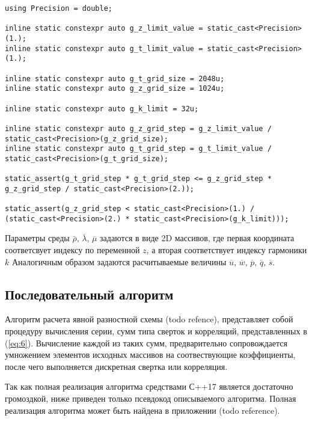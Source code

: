 \begin{lstlisting}
using Precision = double;

inline static constexpr auto g_z_limit_value = static_cast<Precision>(1.);
inline static constexpr auto g_t_limit_value = static_cast<Precision>(1.);

inline static constexpr auto g_t_grid_size = 2048u;
inline static constexpr auto g_z_grid_size = 1024u;

inline static constexpr auto g_k_limit = 32u;

inline static constexpr auto g_z_grid_step = g_z_limit_value / static_cast<Precision>(g_z_grid_size);
inline static constexpr auto g_t_grid_step = g_t_limit_value / static_cast<Precision>(g_t_grid_size);

static_assert(g_t_grid_step * g_t_grid_step <= g_z_grid_step * g_z_grid_step / static_cast<Precision>(2.));

static_assert(g_z_grid_step < static_cast<Precision>(1.) / (static_cast<Precision>(2.) * static_cast<Precision>(g_k_limit)));
\end{lstlisting}

Параметры среды $\overline\rho$, $\overline\lambda$, $\overline\mu$ задаются в виде 2D массивов, 
где первая координата соответсвует индексу по переменной $z$, а вторая соответствует индексу гармоники $k$
Аналогичным образом задаются расчитываемые величины $\overline u$, $\overline w$, $\overline p$, $\overline q$, $\overline s$.

\subsection{Последовательный алгоритм}

Алгоритм расчета явной разностной схемы (todo refence), представляет собой процедуру вычисления серии, сумм типа сверток и корреляций,
представленных в (\ref{eq:6}). Вычисление каждой из таких сумм, предварительно сопровождается умножением элементов исходных 
массивов на соотвествующие коэффициенты, после чего выполняется дискретная свертка или корреляция.

Так как полная реализация алгоритма средствами С++17 является достаточно громоздкой, ниже приведен только псевдокод описываемого алгоритма.
Полная реализация алгоритма может быть найдена в приложении (todo reference).

